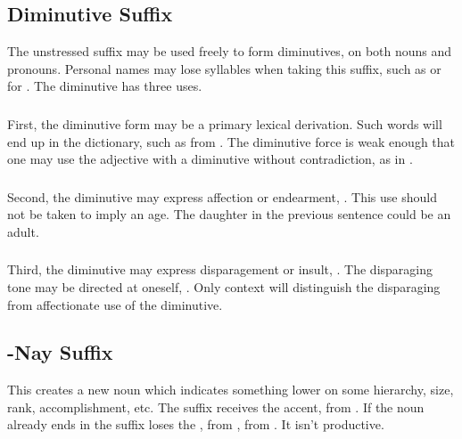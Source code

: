\subsection{Diminutive Suffix} The unstressed suffix  may be
used freely to form diminutives, on both nouns and pronouns.  Personal
names may lose syllables when taking this suffix, such as  or
 for .  The diminutive has three uses.
\label{lingop:dimin}

\subsubsection{} First, the diminutive form may be a primary lexical
derivation.  Such words will end up in the dictionary, such as
  from  .  The
diminutive force is weak enough that one may use the adjective
  with a diminutive without contradiction, as in
 .

\subsubsection{} Second, the diminutive may express affection or
endearment,  . This use should not be taken to imply an age.  The daughter
in the previous sentence could be an adult.

\subsubsection{} Third, the diminutive may express disparagement or
insult,  .  The disparaging
tone may be directed at oneself,  .  Only context will distinguish
the disparaging from affectionate use of the diminutive.


\subsection{-Nay Suffix} This creates a new noun which indicates
something lower on some hierarchy, size, rank, accomplishment, etc.
The suffix receives the accent,   from  .  If the noun already ends in
 the suffix loses the , 
 from  , 
 from  .  It isn't productive.


